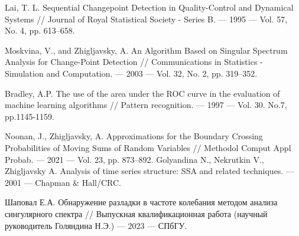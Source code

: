 \documentclass{math-mech-sci}
\begin{document}
\begin{thebibliography}{8}

 Lai, T. L. Sequential Changepoint Detection in Quality-Control and
Dynamical Systems // Journal of Royal Statistical Society - Series B. --- 1995 ---
Vol. 57, No. 4, pp. 613–658. 

 Moskvina, V., and Zhigljavsky, A. An Algorithm Based on Singular Spectrum Analysis for Change-Point Detection // Communications in Statistics - Simulation and Computation. --- 2003 --- Vol. 32, No. 2, pp. 319–352.

 Bradley, A.P. The use of the area under the ROC curve in the evaluation of machine learning algorithms // Pattern recognition. --- 1997 --- Vol. 30. No.7, pp.1145-1159.

 Noonan, J., Zhigljavsky, A. Approximations for the Boundary Crossing Probabilities of Moving Sums of Random Variables // Methodol Comput Appl Probab. --- 2021 --- Vol. 23, pp. 873–892. %
 Golyandina N., Nekrutkin V., Zhigljavsky A. Analysis of time series
structure: SSA and related techniques. --- 2001 --- Chapman \& Hall/CRC.

 Шаповал Е.А. Обнаружение разладки в частоте колебания методом анализа сингулярного спектра // Выпускная квалификационная работа (научный руководитель Голяндина Н.Э.) --- 2023 --- СПбГУ.



\end{thebibliography}
\end{document}
